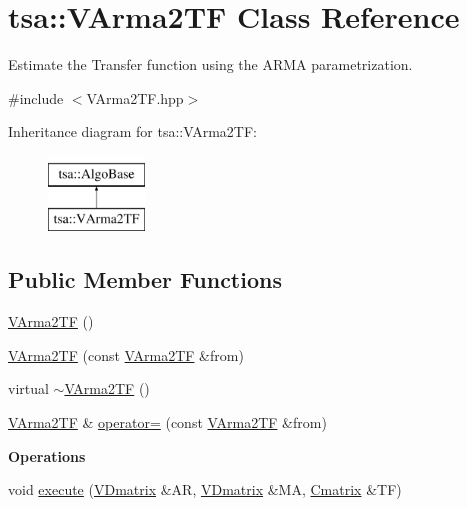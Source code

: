 \hypertarget{classtsa_1_1_v_arma2_t_f}{}\section{tsa\+:\+:V\+Arma2\+TF Class Reference}
\label{classtsa_1_1_v_arma2_t_f}


Estimate the Transfer function using the A\+R\+MA parametrization.  




{\ttfamily \#include $<$V\+Arma2\+T\+F.\+hpp$>$}

Inheritance diagram for tsa\+:\+:V\+Arma2\+TF\+:\begin{figure}[H]
\begin{center}
\leavevmode
\includegraphics[height=2.000000cm]{classtsa_1_1_v_arma2_t_f}
\end{center}
\end{figure}
\subsection*{Public Member Functions}
\begin{DoxyCompactItemize}
\item 
\hyperlink{classtsa_1_1_v_arma2_t_f_a70dbd25e305c6dc002b56994e249fb7e}{V\+Arma2\+TF} ()
\item 
\hyperlink{classtsa_1_1_v_arma2_t_f_acb49999f01a40c655b7a29aac47024fc}{V\+Arma2\+TF} (const \hyperlink{classtsa_1_1_v_arma2_t_f}{V\+Arma2\+TF} \&from)
\item 
virtual \hyperlink{classtsa_1_1_v_arma2_t_f_a04c81fb435781fe74cb6108f64761b0d}{$\sim$\+V\+Arma2\+TF} ()
\item 
\hyperlink{classtsa_1_1_v_arma2_t_f}{V\+Arma2\+TF} \& \hyperlink{classtsa_1_1_v_arma2_t_f_a8e3f21b2a104259f2b27e5ea03bc500e}{operator=} (const \hyperlink{classtsa_1_1_v_arma2_t_f}{V\+Arma2\+TF} \&from)
\end{DoxyCompactItemize}
\begin{Indent}\textbf{ Operations}\par
\begin{DoxyCompactItemize}
\item 
void \hyperlink{classtsa_1_1_v_arma2_t_f_ab67f580ca661de7c0b495a0f36a4e205}{execute} (\hyperlink{namespacetsa_a6dd7105c3202ef00a213d7c029f5b248}{V\+Dmatrix} \&AR, \hyperlink{namespacetsa_a6dd7105c3202ef00a213d7c029f5b248}{V\+Dmatrix} \&MA, \hyperlink{namespacetsa_a86348fef1603a135fe5fba9e5f5486ee}{Cmatrix} \&TF)
\end{DoxyCompactItemize}
\end{Indent}
